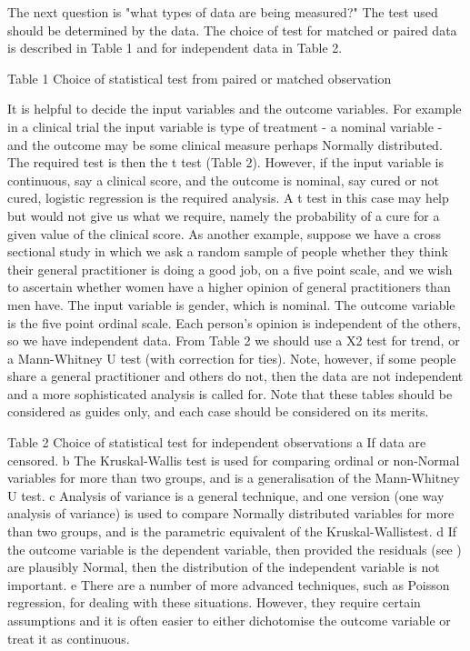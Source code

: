 The next question is "what types of data are being measured?" The test used should be determined by the data. The choice of test for matched or paired data is described in Table 1 and for independent data in Table 2.

Table 1 Choice of statistical test from paired or matched observation

It is helpful to decide the input variables and the outcome variables. For example in a clinical trial the input variable is type of treatment - a nominal variable - and the outcome may be some clinical measure perhaps Normally distributed. The required test is then the t test (Table 2). However, if the input variable is continuous, say a clinical score, and the outcome is nominal, say cured or not cured, logistic regression is the required analysis. A t test in this case may help but would not give us what we require, namely the probability of a cure for a given value of the clinical score. As another example, suppose we have a cross sectional study in which we ask a random sample of people whether they think their general practitioner is doing a good job, on a five point scale, and we wish to ascertain whether women have a higher opinion of general practitioners than men have. The input variable is gender, which is nominal. The outcome variable is the five point ordinal scale. Each person's opinion is independent of the others, so we have independent data. From Table 2 we should use a X2 test for trend, or a Mann-Whitney U test (with correction for ties). Note, however, if some people share a general practitioner and others do not, then the data are not independent and a more sophisticated analysis is called for. Note that these tables should be considered as guides only, and each case should be considered on its merits.

Table 2 Choice of statistical test for independent observations 
a If data are censored. b The Kruskal-Wallis test is used for comparing ordinal or non-Normal variables for more than two groups, and is a generalisation of the Mann-Whitney U test. c Analysis of variance is a general technique, and one version (one way analysis of variance) is used to compare Normally distributed variables for more than two groups, and is the parametric equivalent of the Kruskal-Wallistest. d If the outcome variable is the dependent variable, then provided the residuals (see ) are plausibly Normal, then the distribution of the independent variable is not important. e There are a number of more advanced techniques, such as Poisson regression, for dealing with these situations. However, they require certain assumptions and it is often easier to either dichotomise the outcome variable or treat it as continuous.

